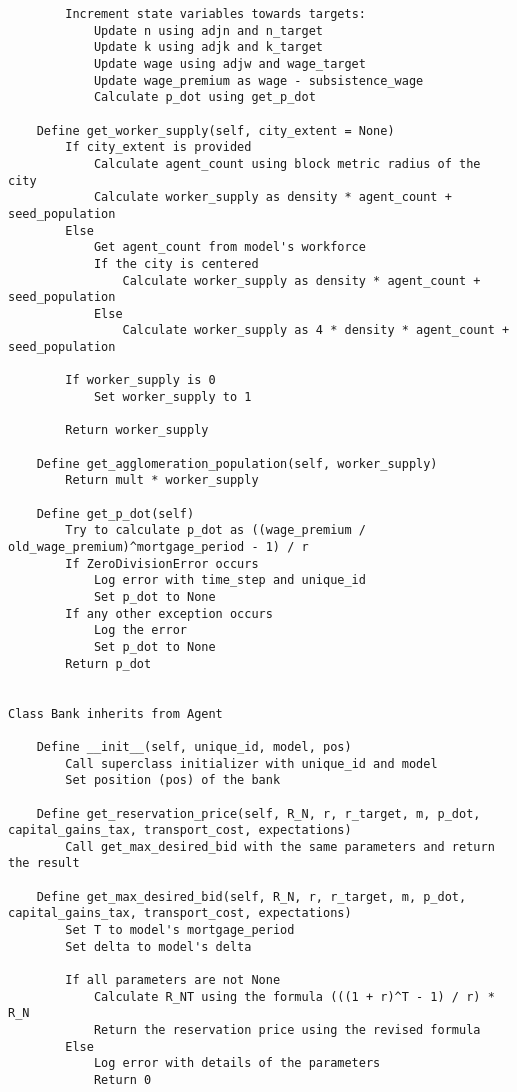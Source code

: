 {\begin{verbatim}
        Increment state variables towards targets:
            Update n using adjn and n_target
            Update k using adjk and k_target
            Update wage using adjw and wage_target
            Update wage_premium as wage - subsistence_wage
            Calculate p_dot using get_p_dot

    Define get_worker_supply(self, city_extent = None)
        If city_extent is provided
            Calculate agent_count using block metric radius of the city
            Calculate worker_supply as density * agent_count + seed_population
        Else
            Get agent_count from model's workforce
            If the city is centered
                Calculate worker_supply as density * agent_count + seed_population
            Else
                Calculate worker_supply as 4 * density * agent_count + seed_population
        
        If worker_supply is 0
            Set worker_supply to 1
        
        Return worker_supply

    Define get_agglomeration_population(self, worker_supply)
        Return mult * worker_supply

    Define get_p_dot(self)
        Try to calculate p_dot as ((wage_premium / old_wage_premium)^mortgage_period - 1) / r
        If ZeroDivisionError occurs
            Log error with time_step and unique_id
            Set p_dot to None
        If any other exception occurs
            Log the error
            Set p_dot to None
        Return p_dot


Class Bank inherits from Agent

    Define __init__(self, unique_id, model, pos)
        Call superclass initializer with unique_id and model
        Set position (pos) of the bank

    Define get_reservation_price(self, R_N, r, r_target, m, p_dot, capital_gains_tax, transport_cost, expectations)
        Call get_max_desired_bid with the same parameters and return the result

    Define get_max_desired_bid(self, R_N, r, r_target, m, p_dot, capital_gains_tax, transport_cost, expectations)
        Set T to model's mortgage_period
        Set delta to model's delta

        If all parameters are not None
            Calculate R_NT using the formula (((1 + r)^T - 1) / r) * R_N
            Return the reservation price using the revised formula
        Else
            Log error with details of the parameters
            Return 0


\end{verbatim}}
